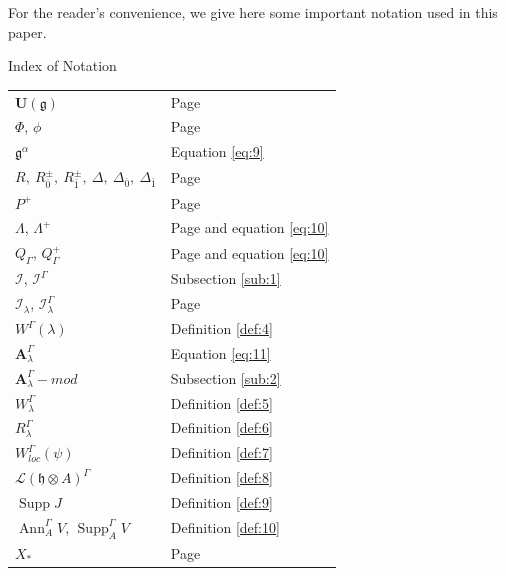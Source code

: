 \documentclass[11pt]{amsart}
\theoremstyle{plain}
\theoremstyle{definition}
\newcommand{\g}{\mathfrak{g}}
\newcommand{\h}{\mathfrak{h}}
\newcommand{\A}{\mathbf{A}_{\lambda}^{\Gamma}}
\DeclareMathOperator{\Ann}{Ann}
\DeclareMathOperator{\Supp}{Supp}
\begin{document}
 For the reader's convenience, we give here some important notation used in this paper. 
  \begin{center}
      {\sc Index of Notation}
  \end{center} 
    \noindent
\begin{minipage}[t]{0.48\textwidth}
\centering
    \begin{tabular}{p{5cm}p{2.5cm}}
       $\mathbf{U}(\g)$  & Page \pageref{pg:1} \\
       $\Phi$, $\phi$  & Page \pageref{pg:2}\\
       $\g^{\alpha}$ & Equation \ref{eq:9}\\
       $R,~R_{\bar{0}}^{\pm},~R_{\bar{1}}^{\pm},~\Delta,~\Delta_{\bar{0}},~\Delta_{\bar{1}}$ & Page \pageref{pg:3}\\
       $P^{+}$ & Page \pageref{pg:4}\\
       $\Lambda$, $\Lambda^{+}$ & Page \pageref{pg:4} and equation \ref{eq:10}\\
       $Q_{\Gamma}$, $Q_{\Gamma}^{+}$ & Page \pageref{pg:6} and equation \ref{eq:10}\\
       $\mathcal{I}$, $\mathcal{I}^{\Gamma}$  & Subsection \ref{sub:1}\\
       $\mathcal{I}_{\lambda}$, $\mathcal{I}_{\lambda}^{\Gamma}$ & Page \pageref{pg:5}\\
       $W^{\Gamma}(\lambda)$ & Definition \ref{def:4}\\
       $\A$ & Equation \ref{eq:11}\\
       $\A-mod$ & Subsection \ref{sub:2}\\
       $W^{\Gamma}_{\lambda}$ & Definition \ref{def:5}\\
       $R_{\lambda}^{\Gamma}$ & Definition \ref{def:6}\\
       $W^{\Gamma}_{loc}(\psi)$ & Definition \ref{def:7}\\
       $\mathcal{L}(\h\otimes A)^{\Gamma}$ & Definition \ref{def:8}\\
       $\Supp J$ & Definition \ref{def:9}\\ $\Ann_{A}^{\Gamma}V$,  $\Supp^{\Gamma}_{A}V$ & Definition \ref{def:10}\\ 
        $X_{*}$ & Page \pageref{pg:7}\\
       \end{tabular}
\end{minipage}
\hfill
\end{document}
